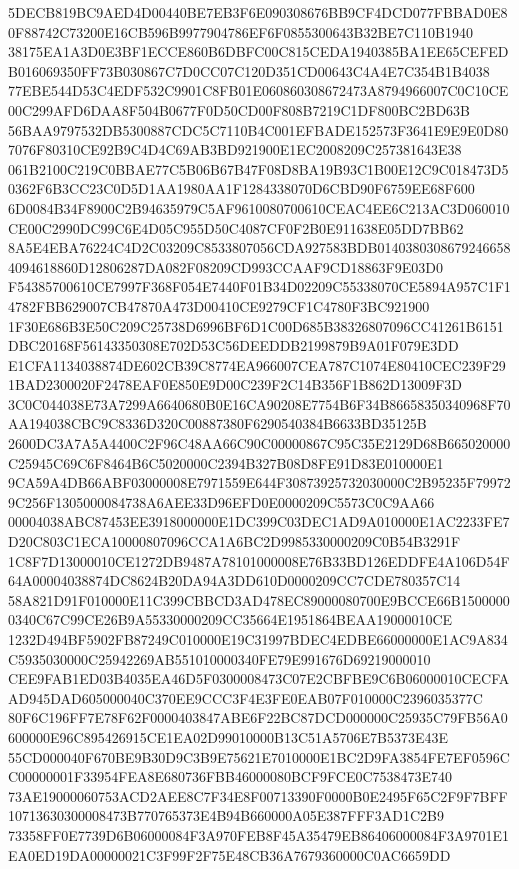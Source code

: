 \documentclass[UTF8,fontset=fandol,zihao=-4,a4paper]{ctexart}
\begin{document}
{{5DECB819BC9AED4D00440BE7EB3F6E090308676BB9CF4DCD077FBBAD0E80F88742C73200E16CB596B9977904786EF6F0855300643B32BE7C110B1940
38175EA1A3D0E3BF1ECCE860B6DBFC00C815CEDA1940385BA1EE65CEFEDB016069350FF73B030867C7D0CC07C120D351CD00643C4A4E7C354B1B4038
77EBE544D53C4EDF532C9901C8FB01E060860308672473A8794966007C0C10CE00C299AFD6DAA8F504B0677F0D50CD00F808B7219C1DF800BC2BD63B
56BAA9797532DB5300887CDC5C7110B4C001EFBADE152573F3641E9E9E0D807076F80310CE92B9C4D4C69AB3BD921900E1EC2008209C257381643E38
061B2100C219C0BBAE77C5B06B67B47F08D8BA19B93C1B00E12C9C018473D50362F6B3CC23C0D5D1AA1980AA1F1284338070D6CBD90F6759EE68F600
6D0084B34F8900C2B94635979C5AF9610080700610CEAC4EE6C213AC3D060010CE00C2990DC99C6E4D05C955D50C4087CF0F2B0E911638E05DD7BB62
8A5E4EBA76224C4D2C03209C8533807056CDA927583BDB01403803086792466584094618860D12806287DA082F08209CD993CCAAF9CD18863F9E03D0
F54385700610CE7997F368F054E7440F01B34D02209C55338070CE5894A957C1F14782FBB629007CB47870A473D00410CE9279CF1C4780F3BC921900
1F30E686B3E50C209C25738D6996BF6D1C00D685B38326807096CC41261B6151DBC20168F56143350308E702D53C56DEEDDB2199879B9A01F079E3DD
E1CFA1134038874DE602CB39C8774EA966007CEA787C1074E80410CEC239F291BAD2300020F2478EAF0E850E9D00C239F2C14B356F1B862D13009F3D
3C0C044038E73A7299A6640680B0E16CA90208E7754B6F34B86658350340968F70AA194038CBC9C8336D320C00887380F6290540384B6633BD35125B
2600DC3A7A5A4400C2F96C48AA66C90C00000867C95C35E2129D68B665020000C25945C69C6F8464B6C5020000C2394B327B08D8FE91D83E010000E1
9CA59A4DB66ABF03000008E7971559E644F30873925732030000C2B95235F799729C256F1305000084738A6AEE33D96EFD0E0000209C5573C0C9AA66
00004038ABC87453EE3918000000E1DC399C03DEC1AD9A010000E1AC2233FE7D20C803C1ECA10000807096CCA1A6BC2D9985330000209C0B54B3291F
1C8F7D13000010CE1272DB9487A78101000008E76B33BD126EDDFE4A106D54F64A00004038874DC8624B20DA94A3DD610D0000209CC7CDE780357C14
58A821D91F010000E11C399CBBCD3AD478EC89000080700E9BCCE66B15000000340C67C99CE26B9A55330000209CC35664E1951864BEAA19000010CE
1232D494BF5902FB87249C010000E19C31997BDEC4EDBE66000000E1AC9A834C5935030000C25942269AB551010000340FE79E991676D69219000010
CEE9FAB1ED03B4035EA46D5F0300008473C07E2CBFBE9C6B06000010CECFAAD945DAD605000040C370EE9CCC3F4E3FE0EAB07F010000C2396035377C
80F6C196FF7E78F62F0000403847ABE6F22BC87DCD000000C25935C79FB56A0600000E96C895426915CE1EA02D99010000B13C51A5706E7B5373E43E
55CD000040F670BE9B30D9C3B9E75621E7010000E1BC2D9FA3854FE7EF0596CC00000001F33954FEA8E680736FBB46000080BCF9FCE0C7538473E740
73AE19000060753ACD2AEE8C7F34E8F00713390F0000B0E2495F65C2F9F7BFF10713630300008473B770765373E4B94B660000A05E387FFF3AD1C2B9
73358FF0E7739D6B06000084F3A970FEB8F45A35479EB86406000084F3A9701E1EA0ED19DA00000021C3F99F2F75E48CB36A7679360000C0AC6659DD
}}
\end{document}
